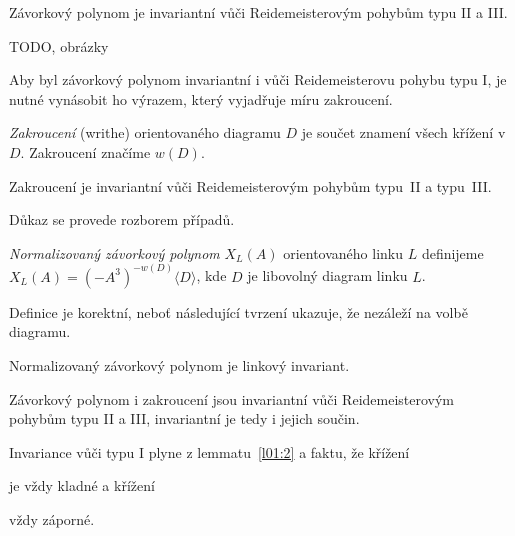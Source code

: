\begin{tvrz}\label{t01:3}
Závorkový polynom je invariantní vůči Reidemeisterovým pohybům typu II a III.
\end{tvrz}
\begin{dukaz}
TODO, obrázky
\end{dukaz}

Aby byl závorkový polynom invariantní i vůči Reidemeisterovu pohybu typu I, je nutné vynásobit ho výrazem, který vyjadřuje míru zakroucení.

\begin{definice}\label{def01:3}
\emph{Zakroucení} (writhe) orientovaného diagramu $D$ je součet znamení všech křížení v $D$. Zakroucení značíme $w(D)$.
\end{definice}

\begin{lemma}\label{l01:4}
Zakroucení je invariantní vůči Reidemeisterovým pohybům typu~II a typu~III.
\end{lemma}
\begin{dukaz}
Důkaz se provede rozborem případů.
\end{dukaz}

\begin{definice}\label{def01:4}
\emph{Normalizovaný závorkový polynom} $X_L(A)$ orientovaného linku $L$ definijeme $X_L(A) = (-A^3)^{-w(D)}\langle D \rangle$, kde $D$ je libovolný diagram linku $L$.
\end{definice}

Definice je korektní, neboť následující tvrzení ukazuje, že nezáleží na volbě diagramu.

\begin{tvrz}\label{t01:5}
Normalizovaný závorkový polynom je linkový invariant.
\end{tvrz}
\begin{dukaz}
Závorkový polynom i zakroucení jsou invariantní vůči Reidemeisterovým pohybům typu II a III, invariantní je tedy i jejich součin.

Invariance vůči typu I plyne z lemmatu~\ref{l01:2} a faktu, že křížení   
je vždy kladné a křížení 
 vždy záporné.
\end{dukaz}

